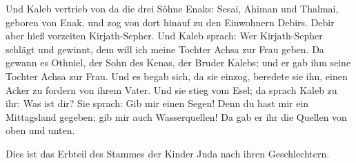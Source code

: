 Und Kaleb vertrieb von da die drei Söhne Enaks: Sesai,
Ahiman und Thalmai, geboren von Enak,  und zog von dort
hinauf zu den Einwohnern Debirs. Debir aber hieß vorzeiten
Kirjath-Sepher.  Und Kaleb sprach: Wer Kirjath-Sepher
schlägt und gewinnt, dem will ich meine Tochter Achsa zur Frau geben.
 Da gewann es Othniel, der Sohn des Kenas, der Bruder
Kalebs; und er gab ihm seine Tochter Achsa zur Frau.  Und
es begab sich, da sie einzog, beredete sie ihn, einen Acker zu fordern
von ihrem Vater. Und sie stieg vom Esel; da sprach Kaleb zu ihr: Was ist
dir?  Sie sprach: Gib mir einen Segen! Denn du hast mir
ein Mittagsland gegeben; gib mir auch Wasserquellen! Da gab er ihr die
Quellen von oben und unten.

 Dies ist das Erbteil des Stammes der Kinder Juda nach
ihren Geschlechtern.

